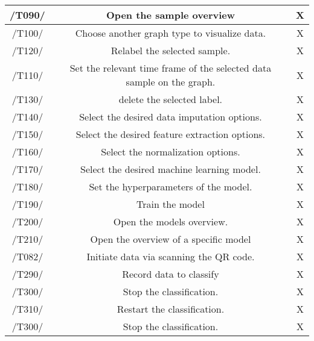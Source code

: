 \begin{table}[h]
{\begin{tabular}{!{\VRule}c!{\VRule}c!{\VRule}c!{\VRule}}
 \hline
  /T090/   &  Open the sample overview  &   X  \\
 \hline
 /T100/    &  Choose another graph type to visualize data.  &   X \\
 \hline
 /T120/  &  Relabel the selected sample. &  X   \\
 \hline
 /T110/ & Set the relevant time frame of the selected data sample on the graph.  &   X  \\
 \hline
 /T130/  &  delete the selected label. &   X \\
 \hline
 /T140/  &Select the desired data imputation options. &   X \\
 \hline
 /T150/  & Select the desired feature extraction options.    &   X  \\
 \hline
 /T160/   &  Select the normalization options.
 &   X  \\
 \hline
 /T170/ &  Select the desired machine learning model.
 &   X  \\
 \hline
 /T180/ &  Set the hyperparameters of the model. &   X  \\
 \hline
  /T190/  &   Train the model  &   X  \\
 \hline
   /T200/    &  Open the models overview.  &   X  \\
 \hline
 /T210/     &  Open the overview of a specific model  &   X  \\
 \hline
 /T082/ &  Initiate data via scanning the QR code. &  X  \\
 \hline
 /T290/  & Record data to classify  &   X \\
 \hline
  /T300/   &  Stop the classification. &   X  \\
 \hline
 /T310/   &Restart the classification. &   X \\
 \hline
 /T300/   &  Stop the classification. &   X \\
 \hline
\end{tabular}%
}
\end{table}
\clearpage
